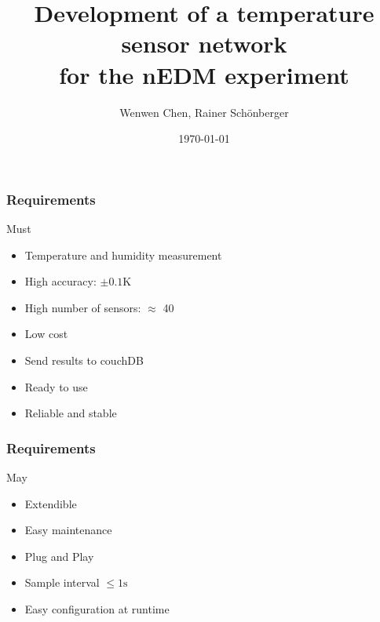 \documentclass[t]{beamer}
\title{Development of a temperature sensor network\\for the nEDM experiment}
\author{Wenwen Chen, Rainer Schönberger}
\date{\today}
\begin{document}
\begin{frame}
    \titlepage
\end{frame}




\begin{frame}[c]
    \frametitle{Requirements}
		\begin{alertblock}{Must}
			\begin{itemize}
				\item Temperature and humidity measurement
				\item High accuracy: $\pm0.1\mathrm{K}$
				\item High number of sensors: $\approx$ 40
        \item Low cost
				\item Send results to couchDB
        \item Ready to use 
				\item Reliable and stable
			\end{itemize}
		\end{alertblock}
\end{frame}
\begin{frame}[c]
    \frametitle{Requirements}
		\begin{exampleblock}{May}
			\begin{itemize}
				\item Extendible
        \item Easy maintenance
				\item Plug and Play
				\item Sample interval $\le 1\mathrm{s}$
				\item Easy configuration at runtime
			\end{itemize}
		\end{exampleblock}
\end{frame}
\end{document}
